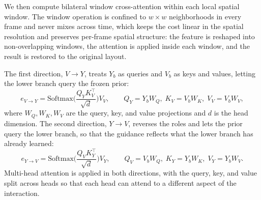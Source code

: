 We then compute bilateral window cross-attention within each local spatial
window. The window operation is confined to $w\times w$ neighborhoods in every
frame and never mixes across time, which keeps the cost linear in the spatial
resolution and preserves per-frame spatial structure: the feature is reshaped
into non-overlapping windows, the attention is applied inside each window, and
the result is restored to the original layout.

The first direction, $V \to Y$, treats $Y_b$ as queries and $V_b$ as keys and
values, letting the lower branch query the frozen prior:
\begin{equation}
  e_{V\to Y} = \mathrm{Softmax}\Big(\frac{Q_{Y} K_{V}^\top}{\sqrt{d}}\Big) V_{V},
  \qquad
  Q_{Y} = Y_b W_Q,\; K_{V} = V_b W_K,\; V_{V} = V_b W_V,
\end{equation}
where $W_Q, W_K, W_V$ are the query, key, and value projections and $d$ is the
head dimension. The second direction, $Y \to V$, reverses the roles and lets
the prior query the lower branch, so that the guidance reflects what the lower
branch has already learned:
\begin{equation}
  e_{Y\to V} = \mathrm{Softmax}\Big(\frac{Q_{V} K_{Y}^\top}{\sqrt{d}}\Big) V_{Y},
  \qquad
  Q_{V} = V_b W_Q,\; K_{Y} = Y_b W_K,\; V_{Y} = Y_b W_V.
\end{equation}
Multi-head attention is applied in both directions, with the query, key, and
value split across heads so that each head can attend to a different aspect of
the interaction.

